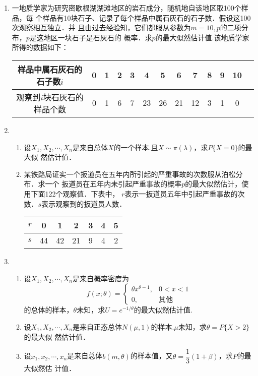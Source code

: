 \documentclass[10pt,a4paper]{article}
\begin{document}
\begin{enumerate}
    \item 一地质学家为研究密歇根湖湖滩地区的岩石成分，随机地自该地区取100个样品，每
    个样品有10块石子、记录了每个样品中属石灰石的石子数．假设这100次观察相互独立．并
    且由过去经验知，它们都服从参数为$m=10,p$的二项分布，$p$是这地区一块石子是石灰石的
    概率．求$p$的最大似然估计值.该地质学家所得的数据如下：
    \renewcommand{\arraystretch}{1.3}
    \begin{table}[H]\centering
        \begin{tabular}{c|cccccccccccc}
        样品中属石灰石的石子数$i$   & 0   & 1  & 2 & 3 & 4 & 5 & 6 & 7 & 8 & 9 & 10 \\ \hline
        观察到$i$块石灰石的样品个数 & 0 & 1 & 6 & 7 & 23 & 26 & 21 & 12 & 3 & 1 & 0 
        \end{tabular}
    \end{table}
    \renewcommand{\arraystretch}{1.0}




    \item \begin{enumerate}
        \item 设$X_1,X_2,\cdots,X_n$是来自总体$X$的一个样本.且$X\sim \pi(\lambda)$，求$P\{X=0\}$的最大似
        然估计值．
        \item 某铁路局证实一个扳道员在五年内所引起的严重事故的次数服从泊松分布．求一个
        扳道员在五年内未引起严重事故的概率$p$的最大似然估计，使用下面122个观察值．下表中，
        $r$表示一扳道员五年中引起严重事故的次数．$s$表示观察到的扳道员人数．
        \renewcommand{\arraystretch}{1.3}
        \begin{table}[H]\centering
            \begin{tabular}{c|cccccc}
            $r$ & 0 & 1 & 2 & 3 & 4 & 5   \\ \hline
            $s$ & 44 & 42 & 21 & 9 & 4 & 2
            \end{tabular}
        \end{table}
        \renewcommand{\arraystretch}{1.0}
    \end{enumerate}
    



    \item \begin{enumerate}
        \item 设$X_1,X_2,\cdots,X_n$是来自概率密度为
        $$f(x;\theta)=\left\{\begin{array}{ll}
            \theta x^{\theta-1}, & 0<x<1\\
            0, & \mbox{其他}
        \end{array}\right.$$
        的总体的样本，$\theta$未知，求$U=e^{-1/\theta}$的最大似然估计值.
        \item 设$X_1,X_2,\cdots,X_n$是来自正态总体$N(\mu,1)$的样本.$\mu$未知，求$\theta=P\{X>2\}$的最大似
        然估计值．
        \item 设$x_1,x_2,\cdots,x_n$是来自总体$b(m,\theta)$的样本值，又$\theta=\dfrac{1}{3}(1+\beta)$，求$P$的最大似然估
        计值．
    \end{enumerate}
    





\end{enumerate}
\end{document}
